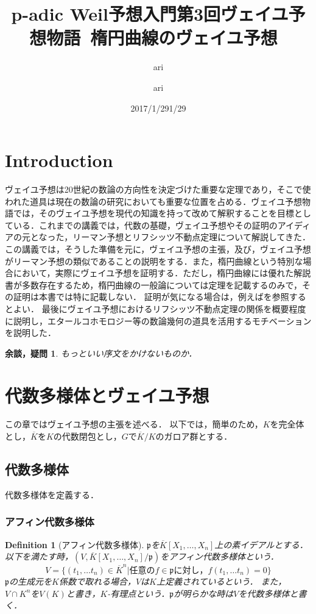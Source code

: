 \documentclass{ujarticle}
\author{ari}
\title{p-adic Weil予想入門}
\date{2017/1/29}
\title{第3回ヴェイユ予想物語~楕円曲線のヴェイユ予想~}
\author{ari}
\date{1/29}
\newtheorem{dfn}[thm]{Definition}
\newtheorem*{yodan}{余談，疑問}
\begin{document}
\maketitle
\tableofcontents

\section{Introduction}
\label{sec:Introduction}

ヴェイユ予想は20世紀の数論の方向性を決定づけた重要な定理であり，そこで使われた道具は現在の数論の研究においても重要な位置を占める．ヴェイユ予想物語では，そのヴェイユ予想を現代の知識を持って改めて解釈することを目標としている．これまでの講義では，代数の基礎，ヴェイユ予想やその証明のアイディアの元となった，リーマン予想とリフシッツ不動点定理について解説してきた．この講義では，そうした準備を元に，ヴェイユ予想の主張，及び，ヴェイユ予想がリーマン予想の類似であることの説明をする．また，楕円曲線という特別な場合において，実際にヴェイユ予想を証明する．ただし，楕円曲線には優れた解説書が多数存在するため，楕円曲線の一般論については定理を記載するのみで，その証明は本書では特に記載しない．
証明が気になる場合は，例えば\cite{s}を参照するとよい．
最後にヴェイユ予想におけるリフシッツ不動点定理の関係を概要程度に説明し，エタールコホモロジー等の数論幾何の道具を活用するモチベーションを説明した．
\begin{yodan}
 もっといい序文をかけないものか．
\end{yodan}

\section{代数多様体とヴェイユ予想}
\label{sec:代数多様体とヴェイユ予想}
この章ではヴェイユ予想の主張を述べる．
以下では，簡単のため，$K$を完全体とし，$\overline{K}$を$K$の代数閉包とし，$G$で$\overline{K}/K$のガロア群とする．

\subsection{代数多様体}
\label{sub:代数多様体}
代数多様体を定義する．
\subsubsection{アフィン代数多様体}
\label{subs:アフィン代数多様体}

\begin{dfn}[アフィン代数多様体]
$\mathfrak{p}$を$\overline{K}[X_1,\dots,X_n]$上の素イデアルとする．以下を満たす時，$(V,\overline{K}[X_1,\dots,X_n]/\mathfrak{p})$をアフィン代数多様体という．
\begin{equation*}
  V = \{ (t_1, \dots t_n) \in {\overline{K}}^n | \mbox{任意の}f \in \mathfrak{p} \mbox{に対し，}f(t_1, \dots t_n)=0 \}
\end{equation*}
$\mathfrak{p}$の生成元を$K$係数で取れる場合，$V$は$K$上定義されているという．
また，$V \cap K^n$を$V(K)$と書き，$K$-有理点という．$\mathfrak{p}$が明らかな時は$V$を代数多様体と書く．
\end{dfn}
\end{document}
